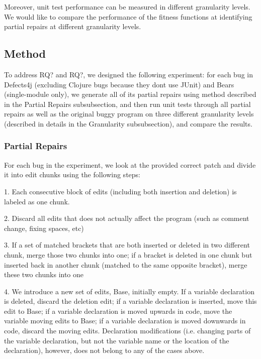 \documentclass[sigconf, timestamp-false, anonymous=true]{acmart}
\begin{document}
Moreover, unit test performance can be measured in different granularity levels. 
We would like to compare the performance of the fitness functions at identifying 
partial repairs at different granularity levels.


\subsection{Method}

To address RQ? and RQ?, we designed the following experiment: for each bug in Defects4j 
(excluding Clojure bugs because they dont use JUnit) 
and Bears (single-module only), we generate all of its partial repairs using method described in 
the Partial Repairs subsubsection, and then run unit tests through all partial repairs
as well as the original buggy program on three different granularity levels (described
in details in the Granularity subsubsection), and compare the results.

\subsubsection{Partial Repairs}

For each bug in the experiment, we look at the provided correct patch and divide it 
into edit chunks using the following steps:

1. Each consecutive block of edits (including both insertion and deletion) 
is labeled as one chunk.

2. Discard all edits that does not actually affect the program 
(such as comment change, fixing spaces, etc)

3. If a set of matched brackets that are both inserted or deleted in two different 
chunk, merge those two chunks into one; if a bracket is deleted in one chunk but 
inserted back in another chunk (matched to the same opposite bracket), merge these 
two chunks into one

4. We introduce a new set of edits, Base, initially empty. If a variable declaration 
is deleted, discard the deletion edit; if a variable declaration is inserted, move this
 edit to Base; if a variable declaration is moved upwards in code, move the variable 
moving edits to Base; if a variable declaration is moved downwards in code, 
discard the moving edits. Declaration modifications (i.e. changing parts of the 
variable declaration, but not the variable name or the location of the declaration), 
however, does not belong to any of the cases above.
\end{document}
